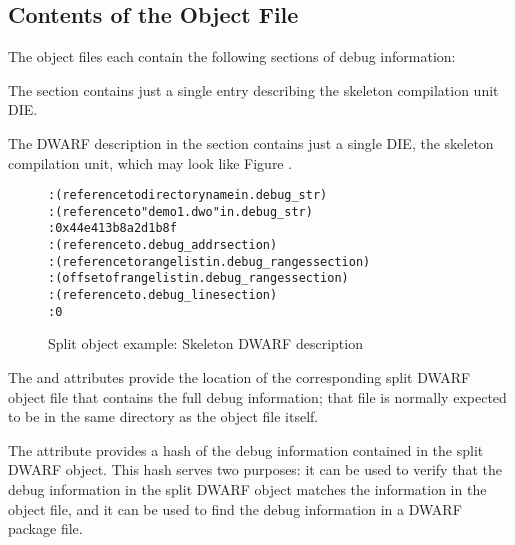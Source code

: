 \clearpage
\subsection{Contents of the Object File}
The object files each contain the following sections of debug
information:
\begin{alltt}
  \dotdebugabbrev
  \dotdebuginfo
  \dotdebugranges
  \dotdebugline
  \dotdebugstr
  \dotdebugaddr
  \dotdebugpubnames
  \dotdebugpubtypes
  \dotdebugaranges
\end{alltt}

The \dotdebugabbrev{} section contains just a single entry describing
the skeleton compilation unit DIE.

The DWARF description in the \dotdebuginfo{} section 
contains just a single DIE, the skeleton compilation unit, 
which may look like 
Figure .

\begin{figure}[h]
\begin{dwflisting}
\begin{alltt}

    \DWTAGcompileunit
      \DWATcompdir: (reference to directory name in .debug_str)
      \DWATdwoname: (reference to "demo1.dwo" in .debug_str)
      \DWATdwoid: 0x44e413b8a2d1b8f
      \DWATaddrbase: (reference to .debug_addr section)
      \DWATrangesbase: (reference to range list in .debug_ranges section)
      \DWATranges: (offset of range list in .debug_ranges section)
      \DWATstmtlist: (reference to .debug_line section)
      \DWATlowpc: 0
      
\end{alltt}
\end{dwflisting}
\caption{Split object example: Skeleton DWARF description}
\label{fig:splitdwafexampleskeletondwarfdescription}
\end{figure}

The \DWATcompdir{} and \DWATdwoname{} attributes provide the
location of the corresponding split DWARF object file that
contains the full debug information; that file is normally
expected to be in the same directory as the object file itself.

The \DWATdwoid{} attribute provides a hash of the debug
information contained in the split DWARF object. This hash serves
two purposes: it can be used to verify that the debug information
in the split DWARF object matches the information in the object
file, and it can be used to find the debug information in a DWARF
package file.

